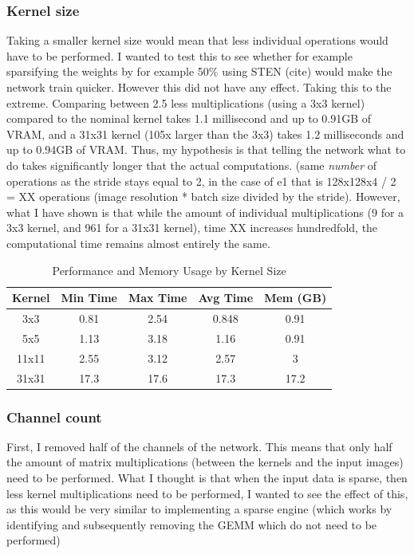 \subsubsection{Kernel size}
Taking a smaller kernel size would mean that less individual operations would have to be performed. I wanted to test this to see whether for example sparsifying the weights by for example 50\% using STEN (cite) would make the network train quicker. However this did not have any effect. Taking this to the extreme. Comparing between 2.5 less multiplications (using a 3x3 kernel) compared to the nominal kernel takes 1.1 millisecond and up to 0.91GB of VRAM, and a 31x31 kernel (105x larger than the 3x3) takes 1.2 milliseconds and up to 0.94GB of VRAM. Thus, my hypothesis is that telling the network what to do takes significantly longer that the actual computations. (same \textit{number} of operations as the stride stays equal to 2, in the case of e1 that is 128x128x4 / 2 = XX operations (image resolution * batch size divided by the stride). However, what I have shown is that while the amount of individual multiplications (9 for a 3x3 kernel, and 961 for a 31x31 kernel), time XX increases hundredfold, the computational time remains almost entirely the same. 

\begin{table}[ht]
    \centering
    \caption{Performance and Memory Usage by Kernel Size}
    \begin{tabular}{|c|c|c|c|c|}
        \hline
        Kernel & Min Time & Max Time & Avg Time & Mem (GB) \\
        \hline
        3x3   & 0.81 & 2.54 & 0.848 & 0.91   \\
        5x5   & 1.13 & 3.18 & 1.16 & 0.91 \\
        11x11 & 2.55 & 3.12 & 2.57 & 3 \\
        31x31 & 17.3 & 17.6 & 17.3 & 17.2 \\
        \hline
    \end{tabular}
    \label{tab:kernel_performance}
\end{table}

\subsubsection{Channel count}
First, I removed half of the channels of the network. This means that only half the amount of matrix multiplications (between the kernels and the input images) need to be performed. What I thought is that when the input data is sparse, then less kernel multiplications need to be performed, I wanted to see the effect of this, as this would be very similar to implementing a sparse engine (which works by identifying and subsequently removing the GEMM which do not need to be performed) 


